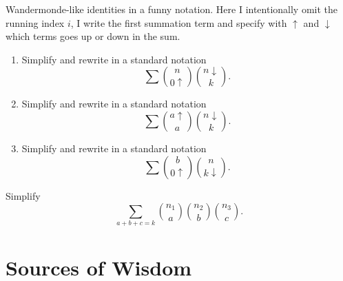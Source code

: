\documentclass[12pt]{article}
\begin{document}
\begin{exercise}
Wandermonde-like identities in a funny notation.
Here I intentionally omit the running index $i$, I write the first summation term and specify with $\uparrow$ and $\downarrow$ which terms goes up or down in the sum. 
\begin{enumerate}[label=\alph*)]
\item Simplify and rewrite in a standard notation
\[
\sum {n \choose 0 {\uparrow}} {n {\downarrow} \choose k}.
\]
\item Simplify and rewrite in a standard notation
\[
\sum {a {\uparrow} \choose a} {n {\downarrow} \choose k}.
\]
\item Simplify and rewrite in a standard notation
\[
\sum {b \choose 0 {\uparrow}} {n \choose k {\downarrow}}.
\]
\end{enumerate}
\end{exercise}



\begin{exercise}
Simplify 
\[
\sum_{a + b + c = k}{n_1 \choose a}{n_2 \choose b}{n_3 \choose c}. %
\]
\end{exercise}



\nocite{graham1994concrete}
\nocite{harris2010combinatorics}
\nocite{guichard2025introcgt}    
\nocite{sackvideo2021magic}
\nocite{3b1b2022counting}
\nocite{huisinga2021polya}
\nocite{baxter2005burnside}
\nocite{kempu2025burnside}







\newpage
\section{Sources of Wisdom}
\printbibtabular[heading=none] %
\end{document}
